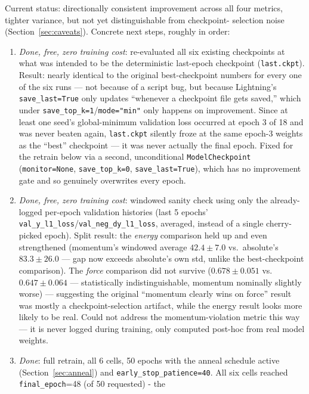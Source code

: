 \documentclass[11pt]{article}
\begin{document}
Current status: directionally consistent improvement across all four
metrics, tighter variance, but not yet distinguishable from checkpoint-
selection noise (Section~\ref{sec:caveats}). Concrete next steps, roughly in
order:
\begin{enumerate}
  \item \emph{Done, free, zero training cost}: re-evaluated all six existing
  checkpoints at what was intended to be the deterministic last-epoch
  checkpoint (\texttt{last.ckpt}). Result: nearly identical to the original
  best-checkpoint numbers for every one of the six runs --- not because of a
  script bug, but because Lightning's \texttt{save\_last=True} only updates
  ``whenever a checkpoint file gets saved,'' which under
  \texttt{save\_top\_k=1}/\texttt{mode="min"} only happens on improvement.
  Since at least one seed's global-minimum validation loss occurred at
  epoch 3 of 18 and was never beaten again, \texttt{last.ckpt} silently
  froze at the same epoch-3 weights as the ``best'' checkpoint --- it was
  never actually the final epoch. Fixed for the retrain below via a second,
  unconditional \texttt{ModelCheckpoint} (\texttt{monitor=None},
  \texttt{save\_top\_k=0}, \texttt{save\_last=True}), which has no
  improvement gate and so genuinely overwrites every epoch.
  \item \emph{Done, free, zero training cost}: windowed sanity check using
  only the already-logged per-epoch validation histories (last 5 epochs'
  \texttt{val\_y\_l1\_loss}/\texttt{val\_neg\_dy\_l1\_loss}, averaged, instead
  of a single cherry-picked epoch). Split result: the \emph{energy}
  comparison held up and even strengthened (momentum's windowed average
  $42.4 \pm 7.0$ vs.\ absolute's $83.3 \pm 26.0$ --- gap now exceeds
  absolute's own std, unlike the best-checkpoint comparison). The
  \emph{force} comparison did not survive ($0.678 \pm 0.051$ vs.\
  $0.647 \pm 0.064$ --- statistically indistinguishable, momentum nominally
  slightly worse) --- suggesting the original ``momentum clearly wins on
  force'' result was mostly a checkpoint-selection artifact, while the
  energy result looks more likely to be real. Could not address the
  momentum-violation metric this way --- it is never logged during
  training, only computed post-hoc from real model weights.
  \item \emph{Done}: full retrain, all 6 cells, 50 epochs with the anneal
  schedule active (Section~\ref{sec:anneal}) and \texttt{early\_stop\_patience=40}.
  All six cells reached \texttt{final\_epoch}=48 (of 50 requested) - the

\end{enumerate}
\end{document}
